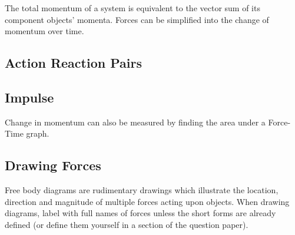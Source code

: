 \documentclass[../main]{subfiles}
\begin{document}
	The total momentum of a system is equivalent to the vector sum of its component objects' momenta. Forces can be simplified into the change of momentum over time.

	\subsection{Action Reaction Pairs}


	\subsection{Impulse}


	Change in momentum can also be measured by finding the area under a Force-Time graph.

	\subsection{Drawing Forces}

	Free body diagrams are rudimentary drawings which illustrate the location, direction and magnitude of multiple forces acting upon objects. When drawing diagrams, label with full names of forces unless the short forms are already defined (or define them yourself in a section of the question paper).
\end{document}
